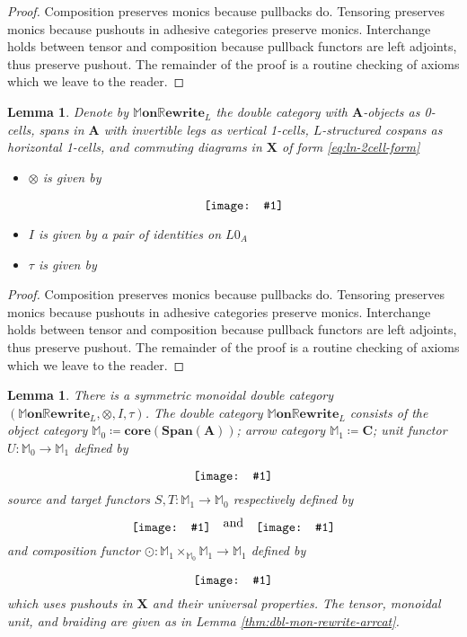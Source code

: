 \documentclass{amsart}
\newcommand{\MM}{\mathbb{M}}
\newcommand{\A}{\cat{A}}
\newcommand{\C}{\cat{C}}
\newcommand{\X}{\cat{X}}
\newcommand{\core}{\mathbf{core}}
\newcommand{\cat}[1]{\mathbf{#1}}
\newcommand{\from}{\colon}
\newcommand{\diagram}[1]{\raisebox{-0.5\height}{\texttt{[image: \#1]}}}
\newcommand{\Span}{\mathbf{Span}}
\newcommand{\MMonRewrite}{ \mathbb{M}\mathbf{on}\mathbb{R}\mathbf{ewrite} }
\newtheorem{lemma}[theorem]{Lemma}
\theoremstyle{remark}
\theoremstyle{definition}
\begin{document}
\begin{proof}
  Composition preserves monics because pullbacks do. Tensoring
  preserves monics because pushouts in adhesive categories preserve
  monics. Interchange holds between tensor and composition because
  pullback functors are left adjoints, thus preserve pushout. The
  remainder of the proof is a routine checking of axioms which we
  leave to the reader.
\end{proof}

\begin{lemma} 
  Denote by $ \MMonRewrite_{L} $ the double category with
  $ \A $-objects as 0-cells, spans in $ \A $ with invertible legs as
  vertical 1-cells, $ L $-structured cospans as horizontal 1-cells,
  and commuting diagrams in $ \X $ of form \eqref{eq:ln-2cell-form}
  \begin{itemize}
\item $ \otimes $ is given by
         \[
            \diagram{diag_lr_dbl-rewrite-tensor}
         \]
   \item $ I $ is given by a pair of identities on $ L0_A $
   \item $ \tau $ is given by
        \begin{center}
          \diagram{diag_lr_dbl-rewrite-braiding}
        \end{center}
   \end{itemize}
\end{lemma}

\begin{proof}
  Composition preserves monics because pullbacks do. Tensoring
  preserves monics because pushouts in adhesive categories preserve
  monics. Interchange holds between tensor and composition because
  pullback functors are left adjoints, thus preserve pushout. The
  remainder of the proof is a routine checking of axioms which we
  leave to the reader.
\end{proof}

\begin{lemma} \label{thm:dbl-mon-rewr-smc} 
  There is a symmetric monoidal double category
  $ (\MMonRewrite_{L} , \otimes , I , \tau) $. The double category
  $ \MMonRewrite_{L} $ consists of the object category
  $ \MM_0 \coloneqq \core (\Span (\A)) $; arrow category
  $ \MM_1 \coloneqq \C $; unit functor $ U \from \MM_0 \to \MM_1 $
  defined by
  \[
    \diagram{diag_lr_dbl-mon-rewrite-unit-functor}
  \]
  source and target functors $ S , T \from \MM_1 \to \MM_0 $
  respectively defined by
  \[
    \diagram{diag_lr_dbl-mon-rewrite-source-functor}
    \quad \text{and} \quad
    \diagram{diag_lr_dbl-mon-rewrite-target-functor}
  \]
  and composition functor
  $ \odot \from \MM_1 \times_{\MM_0} \MM_1 \to \MM_1 $ defined
  by
  \[
    \diagram{diag_lr_dbl-mon-rewrite-composition-functor}
  \]
  which uses pushouts in $ \X $ and their universal properties.
  The tensor, monoidal unit, and braiding are given as in Lemma
  \ref{thm:dbl-mon-rewrite-arrcat}.
\end{lemma}
\end{document}

